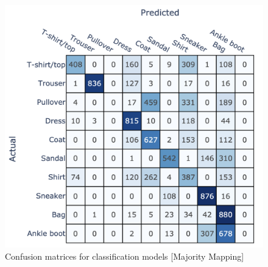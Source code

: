 \begin{figure}[!htb]
\begin{minipage}{0.33\textwidth}
    \end{minipage}\hfill
    \begin{minipage}{0.33\textwidth}
        \centering
        \includegraphics[width=1\linewidth]{images/CM_HybridPipeline_MajorityMapping_CNN.png}
    \end{minipage}
    \caption{\footnotesize Confusion matrices for classification models [Majority Mapping]}
    \label{fig:confusion_matrices_majority}
 \end{figure}

